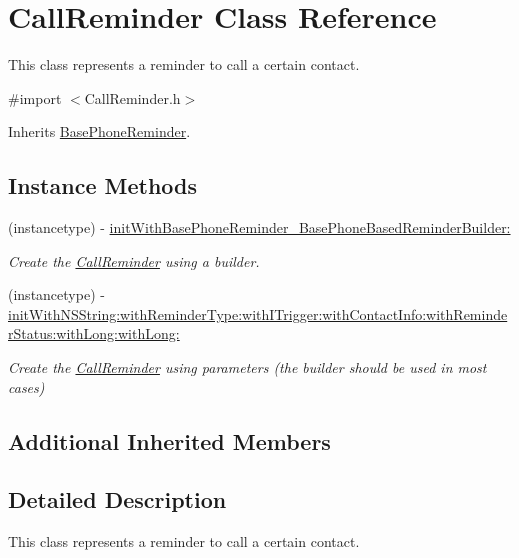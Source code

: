 \hypertarget{interface_call_reminder}{}\section{Call\+Reminder Class Reference}
\label{interface_call_reminder}


This class represents a reminder to call a certain contact.  




{\ttfamily \#import $<$Call\+Reminder.\+h$>$}



Inherits \hyperlink{interface_base_phone_reminder}{Base\+Phone\+Reminder}.

\subsection*{Instance Methods}
\begin{DoxyCompactItemize}
\item 
(instancetype) -\/ \hyperlink{interface_call_reminder_a06d63dab0b5d216071e596eaceb26bd0}{init\+With\+Base\+Phone\+Reminder\+\_\+\+Base\+Phone\+Based\+Reminder\+Builder\+:}
\begin{DoxyCompactList}\small\item\em Create the \hyperlink{interface_call_reminder}{Call\+Reminder} using a builder. \end{DoxyCompactList}\item 
(instancetype) -\/ \hyperlink{interface_call_reminder_a2bc6d1cbfc4c636ff0ce5c7de8cd3ff3}{init\+With\+N\+S\+String\+:with\+Reminder\+Type\+:with\+I\+Trigger\+:with\+Contact\+Info\+:with\+Reminder\+Status\+:with\+Long\+:with\+Long\+:}
\begin{DoxyCompactList}\small\item\em Create the \hyperlink{interface_call_reminder}{Call\+Reminder} using parameters (the builder should be used in most cases) \end{DoxyCompactList}\end{DoxyCompactItemize}
\subsection*{Additional Inherited Members}


\subsection{Detailed Description}
This class represents a reminder to call a certain contact. 

